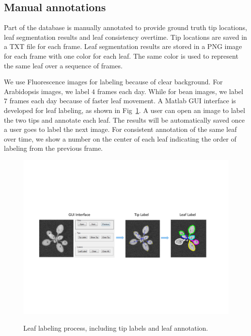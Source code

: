 \subsection{Manual annotations}
Part of the database is manually annotated to provide ground truth tip locations, leaf segmentation results and leaf consistency overtime.
Tip locations are saved in a TXT file for each frame.
Leaf segmentation results are stored in a PNG image for each frame with one color for each leaf.
The same color is used to represent the same leaf over a sequence of frames.

We use Fluorescence images for labeling because of clear background.
For Arabidopsis images, we label $4$ frames each day.
While for bean images, we label $7$ frames each day because of faster leaf movement.
A Matlab GUI interface is developed for leaf labeling, as shown in Fig~\ref{fig:label}.
A user can open an image to label the two tips and annotate each leaf.
The results will be automatically saved once a user goes to label the next image.
For consistent annotation of the same leaf over time, we show a number on the center of each leaf indicating the order of labeling from the previous frame.

\begin{figure}[h]
\centering
\includegraphics[width=.98\textwidth]{Figures/labeling}\\
\caption{Leaf labeling process, including tip labels and leaf annotation.}
\label{fig:label}
\end{figure}

